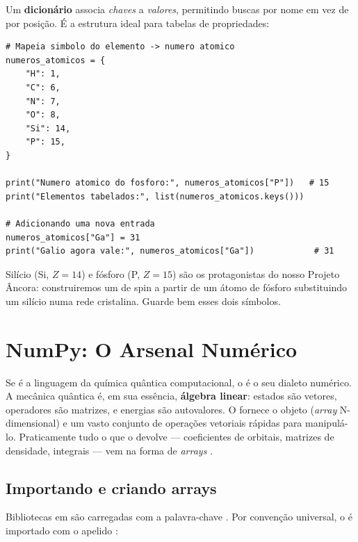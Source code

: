 Um \textbf{dicionário} associa \emph{chaves} a \emph{valores}, permitindo buscas por
nome em vez de por posição. É a estrutura ideal para tabelas de propriedades:

\begin{lstlisting}[style=python,caption={Tabela de números atômicos com dicionário.},label={lst:dict}]
# Mapeia simbolo do elemento -> numero atomico
numeros_atomicos = {
    "H": 1,
    "C": 6,
    "N": 7,
    "O": 8,
    "Si": 14,
    "P": 15,
}

print("Numero atomico do fosforo:", numeros_atomicos["P"])   # 15
print("Elementos tabelados:", list(numeros_atomicos.keys()))

# Adicionando uma nova entrada
numeros_atomicos["Ga"] = 31
print("Galio agora vale:", numeros_atomicos["Ga"])            # 31
\end{lstlisting}

\begin{caixanota}
Silício (Si, $Z=14$) e fósforo (P, $Z=15$) são os protagonistas do nosso
Projeto Âncora: construiremos um \qubit{} de spin a partir de um átomo de fósforo
substituindo um silício numa rede cristalina. Guarde bem esses dois símbolos.
\end{caixanota}

\section{NumPy: O Arsenal Numérico}
\label{sec:numpy}

Se \python{} é a linguagem da química quântica computacional, o \numpy{} é o seu
dialeto numérico. A mecânica quântica é, em sua essência, \textbf{álgebra linear}:
estados são vetores, operadores são matrizes, e energias são autovalores. O
\numpy{} fornece o objeto  (\emph{array} N-dimensional) e um vasto
conjunto de operações vetoriais rápidas para manipulá-lo. Praticamente tudo o que
o \pyscf{} devolve --- coeficientes de orbitais, matrizes de densidade, integrais
--- vem na forma de \emph{arrays} \numpy{}.

\subsection{Importando e criando arrays}

Bibliotecas em \python{} são carregadas com a palavra-chave . Por
convenção universal, o \numpy{} é importado com o apelido :


